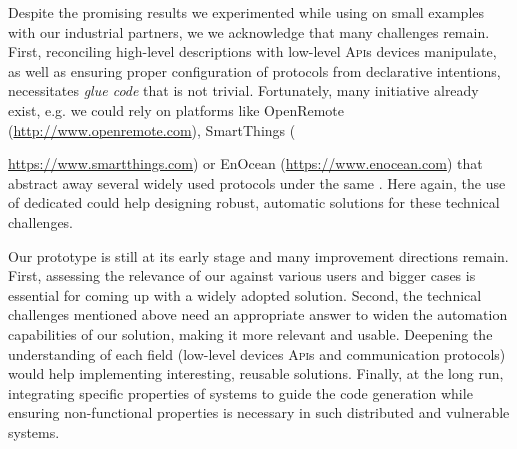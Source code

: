 Despite the promising results we experimented while using \IOTDSL on small examples with our industrial partners, we we acknowledge that many challenges remain. First, reconciling high-level descriptions with low-level \textsc{Api}s devices manipulate, as well as ensuring proper configuration of protocols from declarative intentions, necessitates \emph{glue code} that is not trivial. Fortunately, many initiative already exist, e.g. we could rely on platforms like OpenRemote (\url{http://www.openremote.com}), SmartThings ({\url{https://www.smartthings.com}) or EnOcean (\url{https://www.enocean.com}) that abstract away several widely used protocols under the same \textsc{\Api}. Here again, the use of dedicated \DSLS
 could help designing robust, automatic solutions for these technical challenges.

Our prototype is still at its early stage and many improvement directions remain. First, assessing the relevance of our \DSL against various users and bigger cases is essential for coming up with a widely adopted solution. Second, the technical challenges mentioned above need an appropriate answer to widen the automation capabilities of our solution, making it more relevant and usable. Deepening the understanding of each field (low-level devices \textsc{Api}s and communication protocols) would help implementing interesting, reusable solutions. Finally, at the long run, integrating specific properties of \IOT systems to guide the code generation while ensuring non-functional properties is necessary in such distributed and vulnerable \IOT systems.


}
